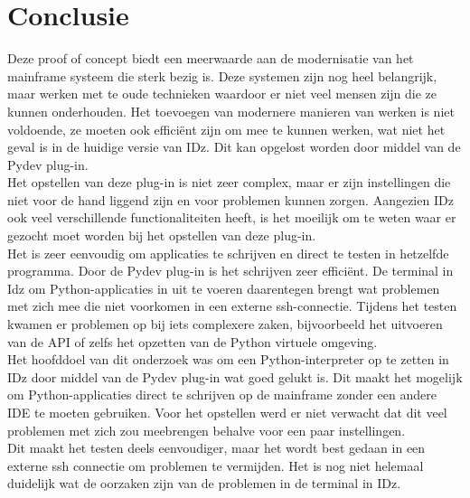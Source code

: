 
\chapter{Conclusie}%
\label{ch:conclusie}


Deze proof of concept biedt een meerwaarde aan de modernisatie van het mainframe systeem die sterk bezig is. Deze systemen zijn nog heel belangrijk, maar werken met te oude technieken waardoor er niet veel mensen zijn die ze kunnen onderhouden. Het toevoegen van modernere manieren van werken is niet voldoende, ze moeten ook efficiënt zijn om mee te kunnen werken, wat niet het geval is in de huidige versie van IDz. Dit kan opgelost worden door middel van de Pydev plug-in. \\

Het opstellen van deze plug-in is niet zeer complex, maar er zijn instellingen die niet voor de hand liggend zijn en voor problemen kunnen zorgen. Aangezien IDz ook veel verschillende functionaliteiten heeft, is het moeilijk om te weten waar er gezocht moet worden bij het opstellen van deze plug-in. \\

Het is zeer eenvoudig om applicaties te schrijven en direct te testen in hetzelfde programma. Door de Pydev plug-in is het schrijven zeer efficiënt. De terminal in Idz om Python-applicaties in uit te voeren daarentegen brengt wat problemen met zich mee die niet voorkomen in een externe ssh-connectie.
Tijdens het testen kwamen er problemen op bij iets complexere zaken, bijvoorbeeld het uitvoeren van de API of zelfs het opzetten van de Python virtuele omgeving. \\

Het hoofddoel van dit onderzoek was om een Python-interpreter op te zetten in IDz door middel van de Pydev plug-in wat goed gelukt is. Dit maakt het mogelijk om Python-applicaties direct te schrijven op de mainframe zonder een andere IDE te moeten gebruiken. Voor het opstellen werd er niet verwacht dat dit veel problemen met zich zou meebrengen behalve voor een paar instellingen. \\
Dit maakt het testen deels eenvoudiger, maar het wordt best gedaan in een externe ssh connectie om problemen te vermijden. Het is nog niet helemaal duidelijk wat de oorzaken zijn van de problemen in de terminal in IDz. \\

